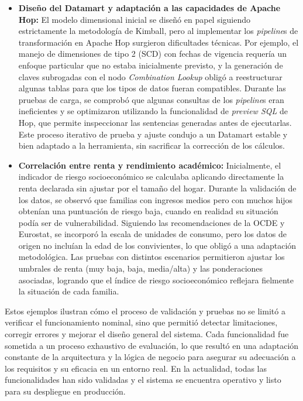 \begin{itemize}
\item \textbf{Diseño del Datamart y adaptación a las capacidades de Apache Hop:} El modelo dimensional inicial se diseñó en papel siguiendo estrictamente la metodología de Kimball, pero al implementar los \textit{pipeline}s de transformación en Apache Hop surgieron dificultades técnicas. Por ejemplo, el manejo de dimensiones de tipo 2 (SCD) con fechas de vigencia requería un enfoque particular que no estaba inicialmente previsto, y la generación de claves subrogadas con el nodo \emph{Combination Lookup} obligó a reestructurar algunas tablas para que los tipos de datos fueran compatibles. Durante las pruebas de carga, se comprobó que algunas consultas de los \textit{pipeline}s eran ineficientes y se optimizaron utilizando la funcionalidad de \emph{preview SQL} de Hop, que permite inspeccionar las sentencias generadas antes de ejecutarlas. Este proceso iterativo de prueba y ajuste condujo a un Datamart estable y bien adaptado a la herramienta, sin sacrificar la corrección de los cálculos.

\item \textbf{Correlación entre renta y rendimiento académico:} Inicialmente, el indicador de riesgo socioeconómico se calculaba aplicando directamente la renta declarada sin ajustar por el tamaño del hogar. Durante la validación de los datos, se observó que familias con ingresos medios pero con muchos hijos obtenían una puntuación de riesgo baja, cuando en realidad su situación podía ser de vulnerabilidad. Siguiendo las recomendaciones de la OCDE y Eurostat, se incorporó la escala de unidades de consumo, pero los datos de origen no incluían la edad de los convivientes, lo que obligó a una adaptación metodológica. Las pruebas con distintos escenarios permitieron ajustar los umbrales de renta (muy baja, baja, media/alta) y las ponderaciones asociadas, logrando que el índice de riesgo socioeconómico reflejara fielmente la situación de cada familia.

\end{itemize}

Estos ejemplos ilustran cómo el proceso de validación y pruebas no se limitó a verificar el funcionamiento nominal, sino que permitió detectar limitaciones, corregir errores y mejorar el diseño general del sistema. Cada funcionalidad fue sometida a un proceso exhaustivo de evaluación, lo que resultó en una adaptación constante de la arquitectura y la lógica de negocio para asegurar su adecuación a los requisitos y su eficacia en un entorno real. En la actualidad, todas las funcionalidades han sido validadas y el sistema se encuentra operativo y listo para su despliegue en producción.